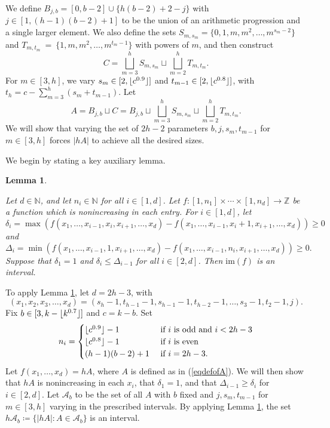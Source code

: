 \documentclass[10pt,a4paper]{article}
\newtheorem{lemma}[theorem]{Lemma}
\theoremstyle{definition}
\theoremstyle{remark}
\numberwithin{equation}{section}
\numberwithin{theorem}{section}
\newcommand{\N}{\mathbb{N}}
\newcommand{\Z}{\mathbb{Z}}
\newcommand{\cala}{\mathcal{A}}
\DeclarePairedDelimiter{\floor}{\lfloor}{\rfloor}
\begin{document}
We define $B_{j,b} = [0,b-2] \cup \{h(b-2)+2-j\}$ with $j \in [1,(h-1)(b-2)+1]$ to be the union of an arithmetic progression and a single larger element. We also define the sets $S_{m,s_m} = \{0,1,m, m^2,\ldots,m^{s_m-2}\}$ and $T_{m,t_m}~=~\{1,m,m^2,\ldots,m^{t_m-1}\}$ with powers of $m$, and then construct \[C = \bigsqcup_{m=3}^h S_{m,s_m} \sqcup \bigsqcup_{m=2}^h T_{m,t_m}.\] For $m \in [3,h]$, we vary $s_m \in [2,\floor{c^{0.9}}]$ and $t_{m-1}\in [2,\floor{c^{0.8}}]$, with $t_h = c - \sum_{m=3}^h(s_m+t_{m-1})$. Let \begin{equation}\label{eqdefofA}
    A = B_{j,b} \sqcup C = B_{j,b}\sqcup\bigsqcup_{m=3}^h S_{m,s_m} \sqcup \bigsqcup_{m=2}^h T_{m,t_m}.
\end{equation} We will show that varying the set of $2h-2$ parameters $b, j, s_m, t_{m-1}$ for $m \in [3,h]$ forces $|hA|$ to achieve all the desired sizes. 

We begin by stating a key auxiliary lemma.

\begin{lemma}\label{lemmahypercubeIVT}

    Let $d\in \N$, and let $n_i \in \N$ for all $i \in [1,d]$. Let $f:[1,n_1]\times \cdots \times [1,n_d] \to \Z$ be a function which is nonincreasing in each entry. For $i \in [1,d]$, let \[\delta_i = \max (f(x_1,\ldots,x_{i-1},x_i,x_{i+1},\ldots,x_d) - f(x_1,\ldots,x_{i-1},x_i+1,x_{i+1},\ldots,x_d)) \geq 0\] and \[\Delta_i = \min (f(x_1,\ldots,x_{i-1},1,x_{i+1},\ldots,x_d) - f(x_1,\ldots,x_{i-1},n_i,x_{i+1},\ldots,x_d)) \geq 0.\] Suppose that $\delta_1 = 1$ and $\delta_{i}\leq \Delta_{i-1}$ for all $i \in [2,d]$. Then $\mathrm{im}(f)$ is an interval.
\end{lemma}
To apply Lemma \ref{lemmahypercubeIVT}, let $d = 2h-3$, with \begin{equation}\label{eqxi}(x_1,x_2,x_3,\ldots,x_{d}) = (s_h-1,t_{h-1}-1,s_{h-1}-1,t_{h-2}-1,\ldots,s_{3}-1,t_2-1,j).\end{equation} Fix $b \in [3,k-\floor{k^{0.7}}]$ and $c = k-b$. Set \begin{equation}\label{eqvalni}
n_i = \begin{cases}
    \floor{c^{0.9}}-1 &\text{ if } i \text{ is odd and } i <2h-3 \\
    \floor{c^{0.8}}-1 &\text{ if } i \text{ is even} \\
    (h-1)(b-2)+1 &\text{ if } i = 2h-3.
\end{cases}\end{equation} Let $f(x_1,\ldots,x_{d}) = hA$, where $A$ is defined as in (\ref{eqdefofA}). We will then show that $hA$ is nonincreasing in each $x_i$, that $\delta_1 = 1$, and that $\Delta_{i-1} \geq \delta_i$ for $i \in [2,d]$. Let $\cala_b$ to be the set of all $A$ with $b$ fixed and $j, s_m, t_{m-1}$ for $m \in [3,h]$ varying in the prescribed intervals. By applying Lemma \ref{lemmahypercubeIVT}, the set $h\cala_b \coloneq  \{|hA|: A \in \cala_b\}$ is an interval. 
\end{document}
